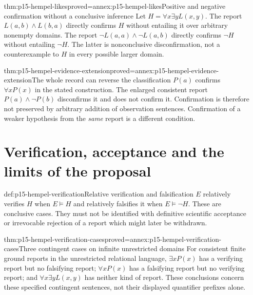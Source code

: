 \begin{hbtheorem}{thm:p15-hempel-likes}{proved=annex:p15-hempel-likes}{Positive and negative confirmation without a conclusive inference}
Let $H=\forall x\exists yL(x,y)$. The report $L(a,b)\land L(b,a)$
directly confirms $H$ without entailing it over arbitrary nonempty domains.
The report $\neg L(a,a)\land\neg L(a,b)$ directly confirms $\neg H$
without entailing $\neg H$. The latter is nonconclusive disconfirmation,
not a counterexample to $H$ in every possible larger domain.
\end{hbtheorem}

\begin{hbtheorem}{thm:p15-hempel-evidence-extension}{proved=annex:p15-hempel-evidence-extension}{The whole record can reverse the classification}
$P(a)$ confirms $\forall xP(x)$ in the stated construction.
The enlarged consistent report $P(a)\land\neg P(b)$ disconfirms it and
does not confirm it. Confirmation is therefore not preserved by arbitrary
addition of observation sentences. Confirmation of a weaker hypothesis
from the \emph{same} report is a different condition.
\end{hbtheorem}

\section{Verification, acceptance and the limits of the proposal}
\label{sec:p15-hempel-verification}

\begin{hbdefinition}{def:p15-hempel-verification}{Relative verification and falsification}
$E$ relatively verifies $H$ when $E\models H$ and relatively falsifies it
when $E\models\neg H$. These are conclusive cases. They must not be
identified with definitive scientific acceptance or irrevocable rejection
of a report which might later be withdrawn.
\end{hbdefinition}

\begin{hbtheorem}{thm:p15-hempel-verification-cases}{proved=annex:p15-hempel-verification-cases}{Three contingent cases on infinite unrestricted domains}
For consistent finite ground reports in the unrestricted relational
language, $\exists xP(x)$ has a verifying report but no falsifying report;
$\forall xP(x)$ has a falsifying report but no verifying report; and
$\forall x\exists yL(x,y)$ has neither kind of report. These conclusions
concern these specified contingent sentences, not their displayed
quantifier prefixes alone.
\end{hbtheorem}

